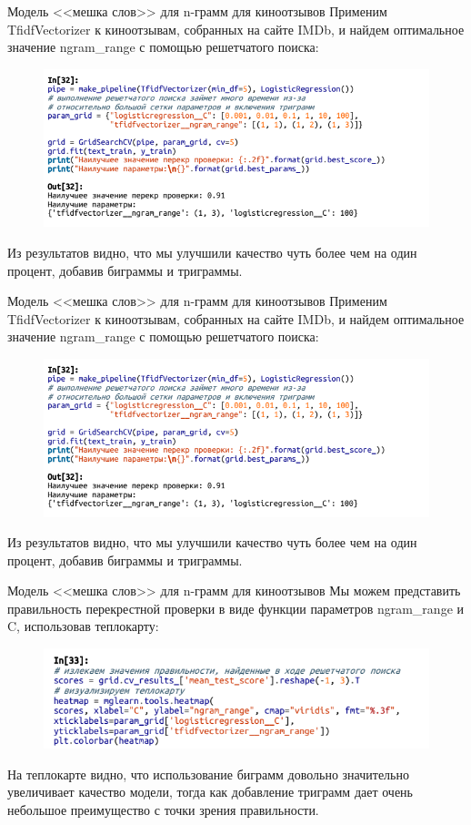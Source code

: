 \documentclass{beamer}
\begin{document}
\begin{frame}{Модель <<мешка слов>> для n-грамм для киноотзывов}
Применим TfidfVectorizer к киноотзывам, собранных на сайте IMDb, и найдем оптимальное значение ngram\_range с помощью решетчатого поиска:
\begin{figure}[h]
\centering
\includegraphics[scale=0.6]{images/lec09-pic32.png}
\end{figure}
Из результатов видно, что мы улучшили качество чуть более чем на один процент, добавив биграммы и триграммы. 
\end{frame}

\begin{frame}{Модель <<мешка слов>> для n-грамм для киноотзывов}
Применим TfidfVectorizer к киноотзывам, собранных на сайте IMDb, и найдем оптимальное значение ngram\_range с помощью решетчатого поиска:
\begin{figure}[h]
\centering
\includegraphics[scale=0.6]{images/lec09-pic32.png}
\end{figure}
Из результатов видно, что мы улучшили качество чуть более чем на один процент, добавив биграммы и триграммы. 
\end{frame}

\begin{frame}{Модель <<мешка слов>> для n-грамм для киноотзывов}
Мы можем представить правильность перекрестной проверки в виде функции параметров
ngram\_range и C, использовав теплокарту:
\begin{figure}[h]
\centering
\includegraphics[scale=0.75]{images/lec09-pic33.png}
\end{figure}
На теплокарте видно, что использование биграмм довольно значительно увеличивает качество модели, тогда как добавление триграмм дает очень небольшое преимущество с точки зрения правильности. 
\end{frame}
\end{document}

